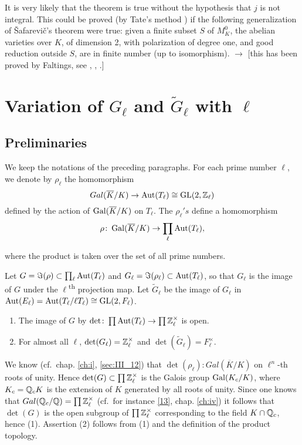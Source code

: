 \begin{obs}
It is very likely that the theorem is true without the hypothesis that $j$ is
not integral. This could be proved (by Tate's method \cite{38}) if the
following generalization of \v Safarevi\v c's theorem were true: given a finite
subset $S$ of $M_K^0$, the abelian varieties over $K$, of dimension 2, with
polarization of degree one, and good reduction outside $S$, are in finite
number (up to isomorphism). $\to$ [this has been proved by Faltings, see
\cite{54}, \cite{56}, \cite{82}.]
\end{obs}

\dpage

\section{Variation of \texorpdfstring{$G_\ell$}{Gℓ} and
\texorpdfstring{$\widetilde{G}_\ell$}{Ḡℓ} with \texorpdfstring{$\ell$}{ℓ}}
\label{sec:IV_3}

\subsection{Preliminaries}
\label{sec:IV_31}

We keep the notations of the preceding paragraphs. For each prime number $\ell$,
we denote by $\rho_{\ell}$ the homomorphism
\[
	Gal(\overline{K}/K) \rightarrow \operatorname{Aut}(T_\ell) \cong \operatorname{GL}(2, \mathbb{Z}_\ell)
\]
defined by the action of $\operatorname{Gal}(\overline{K}/K)$ on $T_\ell$. The $\rho_\ell's$
define a homomorphism
\[
	\rho \colon \operatorname{Gal}(\overline{K}/K) \rightarrow \prod_\ell \operatorname{Aut}(T_\ell),
\]

where the product is taken over the set of all prime numbers.

Let $G = \Im(\rho) \subset \prod_\ell \operatorname{Aut}(T_\ell)$ and $G_\ell = \Im(\rho_\ell)
\subset \operatorname{Aut}(T_\ell)$, so that $G_\ell$ is the image of $G$ under the
$\ell$\textsuperscript{th} projection map. Let $\tilde{G}_\ell$ be the image of
$G_\ell$ in $\operatorname{Aut}(E_\ell) = \operatorname{Aut}(T_\ell / \ell T_\ell) \cong \operatorname{GL}(2, F_\ell)$.

\begin{lem}
\begin{enumerate}
	\item The image of $G$ by $\det \colon \prod \operatorname{Aut}(T_\ell) \rightarrow
\prod \mathbb{Z}^\times_\ell$ is open.
	\item For almost all $\ell$, $\det(G_\ell) = \mathbb{Z}^\times_\ell$ and
$\det(\tilde{G}_\ell) = F^\times_\ell$.
\end{enumerate}
\end{lem}
We know (cf.\ chap. \ref{ch:i}, \ref{sec:III_12}) that $\det(\rho_\ell) \colon
Gal(\overline{K}/K)$ on $\ell^n$-th roots of unity. Hence $\det(G) \subset
\prod \mathbb{Z}_\ell^\times$ is the Galois group $\operatorname{Gal}(K_c / K)$, where $K_c = \mathbb{Q}_cK$
is the extension of $K$ generated by all roots of unity. Since one knows that
$Gal(\mathbb{Q}_c / \mathbb{Q}) = \prod \mathbb{Z}^\times_\ell$ (cf.\ for instance \ref{13}, chap.
\ref{ch:iv}) it follows that $\det(G)$ is the open subgroup of $\prod
\mathbb{Z}^\times_\ell$ corresponding to the field $K \cap \mathbb{Q}_c$, hence (1). Assertion
(2) follows
\dpage
from (1) and the definition of the product topology.

